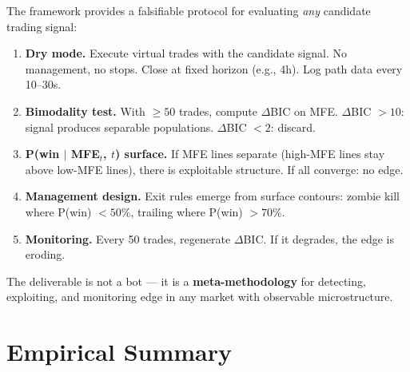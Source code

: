 \documentclass[11pt,a4paper]{article}
\begin{document}
The framework provides a falsifiable protocol for evaluating \emph{any} candidate trading signal:

\begin{enumerate}[leftmargin=2em]
\item \textbf{Dry mode.} Execute virtual trades with the candidate signal. No management, no stops. Close at fixed horizon (e.g., 4h). Log path data every 10--30s.
\item \textbf{Bimodality test.} With $\geq 50$ trades, compute $\Delta$BIC on MFE. $\Delta$BIC $> 10$: signal produces separable populations. $\Delta$BIC $< 2$: discard.
\item \textbf{P(win $|$ MFE$_t$, $t$) surface.} If MFE lines separate (high-MFE lines stay above low-MFE lines), there is exploitable structure. If all converge: no edge.
\item \textbf{Management design.} Exit rules emerge from surface contours: zombie kill where P(win) $< 50\%$, trailing where P(win) $> 70\%$.
\item \textbf{Monitoring.} Every 50 trades, regenerate $\Delta$BIC. If it degrades, the edge is eroding.
\end{enumerate}

The deliverable is not a bot --- it is a \textbf{meta-methodology} for detecting, exploiting, and monitoring edge in any market with observable microstructure.


\section{Empirical Summary}
\label{sec:results}
\end{document}
